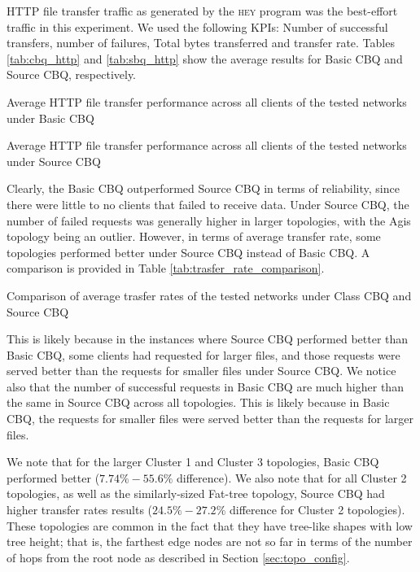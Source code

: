 HTTP file transfer traffic as generated by the \textsc{hey} program was the best-effort traffic in this experiment. We used the following KPIs: Number of successful transfers, number of failures, Total bytes transferred and transfer rate. Tables \ref{tab:cbq_http} and \ref{tab:sbq_http} show the average results for Basic CBQ and Source CBQ, respectively.

\begin{table}[htbp]
    \caption{Average HTTP file transfer performance across all clients of the tested networks under Basic CBQ}
    \centering
    
    \label{tab:cbq_http}
\end{table}

\begin{table}[htbp]
    \caption{Average HTTP file transfer performance across all clients of the tested networks under Source CBQ}
    \centering
    
    \label{tab:sbq_http}
\end{table}

Clearly, the Basic CBQ outperformed Source CBQ in terms of reliability, since there were little to no clients that failed to receive data. Under Source CBQ, the number of failed requests was generally higher in larger topologies, with the Agis topology being an outlier. However, in terms of average transfer rate, some topologies performed better under Source CBQ instead of Basic CBQ. A comparison is provided in Table \ref{tab:trasfer_rate_comparison}.

\begin{table}[htbp]
    \caption{Comparison of average trasfer rates of the tested networks under Class CBQ and Source CBQ}
    \centering
    
    \label{tab:trasfer_rate_comparison}
\end{table}

This is likely because in the instances where Source CBQ performed better than Basic CBQ, some clients had requested for larger files, and those requests were served better than the requests for smaller files under Source CBQ. We notice also that the number of successful requests in Basic CBQ are much higher than the same in Source CBQ across all topologies. This is likely because in Basic CBQ, the requests for smaller files were served better than the requests for larger files.

We note that for the larger Cluster 1 and Cluster 3 topologies, Basic CBQ performed better ($7.74\%-55.6\%$ difference). We also note that for all Cluster 2 topologies, as well as the similarly-sized Fat-tree topology, Source CBQ had higher transfer rates results ($24.5\%-27.2\%$ difference for Cluster 2 topologies). These topologies are common in the fact that they have tree-like shapes with low tree height; that is, the farthest edge nodes are not so far in terms of the number of hops from the root node as described in Section \ref{sec:topo_config}.

